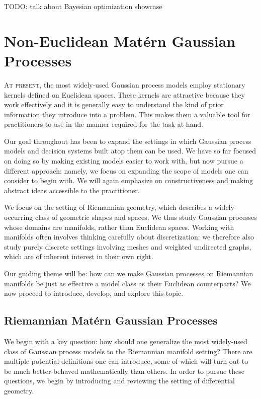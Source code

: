 \documentclass[11pt]{book}
\begin{document}
TODO: talk about Bayesian optimization showcase






\chapter{Non-Euclidean Matérn Gaussian Processes}
\label{ch:noneuclidean}

\lettrine{A}{t present}, the most widely-used Gaussian process models employ stationary kernels defined on Euclidean spaces.
These kernels are attractive because they work effectively and it is generally easy to understand the kind of prior information they introduce into a problem.
This makes them a valuable tool for practitioners to use in the manner required for the task at hand.

Our goal throughout has been to expand the settings in which Gaussian process models and decision systems built atop them can be used.
We have so far focused on doing so by making existing models easier to work with, but now pursue a different approach: namely, we focus on expanding the scope of models one can consider to begin with.
We will again emphasize on constructiveness and making abstract ideas accessible to the practitioner.

We focus on the setting of Riemannian geometry, which describes a widely-occurring class of geometric shapes and spaces.
We thus study Gaussian processes whose domains are manifolds, rather than Euclidean spaces.
Working with manifolds often involves thinking carefully about discretization: we therefore also study purely discrete settings involving meshes and weighted undirected graphs, which are of inherent interest in their own right.

Our guiding theme will be: how can we make Gaussian processes on Riemannian manifolds be just as effective a model class as their Euclidean counterparts?
We now proceed to introduce, develop, and explore this topic.


\section{Riemannian Matérn Gaussian Processes}

We begin with a key question: how should one generalize the most widely-used class of Gaussian process models to the Riemannian manifold setting?
There are multiple potential definitions one can introduce, some of which will turn out to be much better-behaved mathematically than others.
In order to pursue these questions, we begin by introducing and reviewing the setting of differential geometry.
\end{document}
